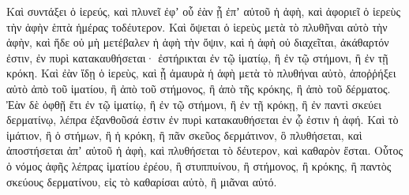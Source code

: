 {Καὶ συντάξει ὁ ἱερεύς, καὶ πλυνεῖ ἐφʼ οὗ ἐὰν ᾖ ἐπʼ αὐτοῦ ἡ ἁφὴ, καὶ ἀφοριεῖ ὁ ἱερεὺς τὴν ἁφὴν ἑπτὰ ἡμέρας τοδέυτερον.
Καὶ ὄψεται ὁ ἱερεὺς μετὰ τὸ πλυθῆναι αὐτὸ τὴν ἁφὴν, καὶ ἥδε οὐ μὴ μετέβαλεν ἡ ἁφὴ τὴν ὄψιν, καὶ ἡ ἁφὴ οὐ διαχεῖται, ἀκάθαρτόν ἐστιν, ἐν πυρὶ κατακαυθήσεται· ἐστήρικται ἐν τῷ ἱματίῳ, ἢ ἐν τῷ στήμονι, ἢ ἐν τῇ κρόκη.
Καὶ ἐὰν ἴδῃ ὁ ἱερεὺς, καὶ ᾖ ἀμαυρὰ ἡ ἁφὴ μετὰ τὸ πλυθήναι αὐτὸ, ἀποῤῥήξει αὐτὸ ἀπὸ τοῦ ἱματίου, ἢ ἀπὸ τοῦ στήμονος, ἢ ἀπὸ τῆς κρόκης, ἢ ἀπὸ τοῦ δέρματος.
Ἐὰν δὲ ὀφθῇ ἔτι ἐν τῷ ἱματίῳ, ἢ ἐν τῷ στήμονι, ἢ ἐν τῇ κρόκῃ, ἢ ἐν παντὶ σκεύει δερματίνῳ, λέπρα ἐξανθοῦσά ἐστιν ἐν πυρὶ κατακαυθήσεται ἐν ᾧ ἐστιν ἡ ἁφή.
Καὶ τὸ ἱμάτιον, ἢ ὁ στήμων, ἢ ἡ κρόκη, ἢ πᾶν σκεῦος δερμάτινον, ὃ πλυθήσεται, καὶ ἀποστήσεται ἀπʼ αὐτοῦ ἡ ἁφὴ, καὶ πλυθήσεται τὸ δέυτερον, καὶ καθαρὸν ἔσται.
Οὗτος ὁ νόμος ἁφῆς λέπρας ἱματίου ἐρέου, ἢ στυππυίνου, ἢ στήμονος, ἢ κρόκης, ἢ παντὸς σκεύους δερματίνου, εἰς τὸ καθαρίσαι αὐτὸ, ἢ μιᾶναι αὐτό.

}
